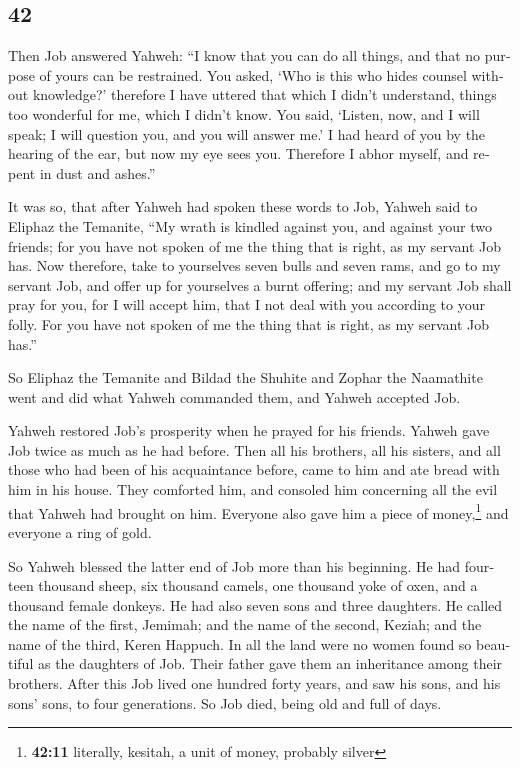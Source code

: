 \begin{paracol}{2}
\begin{otherlanguage}{english}
\hypertarget{section-83}{%
\section{42}\label{section-83}}

 Then Job answered Yahweh:  ``I know that
you can do all things, and that no purpose of yours can be restrained.
 You asked, `Who is this who hides counsel without
knowledge?' therefore I have uttered that which I didn't understand,
things too wonderful for me, which I didn't know.  You
said, `Listen, now, and I will speak; I will question you, and you will
answer me.'  I had heard of you by the hearing of the ear,
but now my eye sees you.  Therefore I abhor myself, and
repent in dust and ashes.''

 It was so, that after Yahweh had spoken these words to
Job, Yahweh said to Eliphaz the Temanite, ``My wrath is kindled against
you, and against your two friends; for you have not spoken of me the
thing that is right, as my servant Job has.  Now
therefore, take to yourselves seven bulls and seven rams, and go to my
servant Job, and offer up for yourselves a burnt offering; and my
servant Job shall pray for you, for I will accept him, that I not deal
with you according to your folly. For you have not spoken of me the
thing that is right, as my servant Job has.''

 So Eliphaz the Temanite and Bildad the Shuhite and Zophar
the Naamathite went and did what Yahweh commanded them, and Yahweh
accepted Job.

 Yahweh restored Job's prosperity when he prayed for his
friends. Yahweh gave Job twice as much as he had before. 
Then all his brothers, all his sisters, and all those who had been of
his acquaintance before, came to him and ate bread with him in his
house. They comforted him, and consoled him concerning all the evil that
Yahweh had brought on him. Everyone also gave him a piece of
money,\footnote{\textbf{42:11} literally, kesitah, a unit of money,
  probably silver} and everyone a ring of gold.

 So Yahweh blessed the latter end of Job more than his
beginning. He had fourteen thousand sheep, six thousand camels, one
thousand yoke of oxen, and a thousand female donkeys.  He
had also seven sons and three daughters.  He called the
name of the first, Jemimah; and the name of the second, Keziah; and the
name of the third, Keren Happuch.  In all the land were
no women found so beautiful as the daughters of Job. Their father gave
them an inheritance among their brothers.  After this Job
lived one hundred forty years, and saw his sons, and his sons' sons, to
four generations.  So Job died, being old and full of
days. \end{otherlanguage} \end{paracol}
